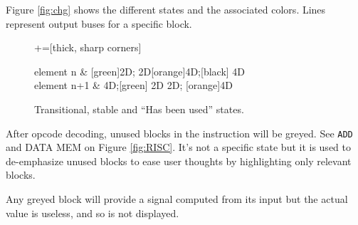 \documentclass[10pt,a4paper]{article}
\theoremstyle{definition}%
\begin{document}
Figure \vref{fig:chg} shows the different states and the associated colors. Lines represent output buses for a specific block.
\begin{figure}[h!]
	\begin{center}
		+=[thick, sharp corners]
		\begin{tikztimingtable}
			element n   &	[green]2D{}; 2D[orange]4D;[black] 4D{}\\
			element n+1	&	4D;[green] 2D{} 2D; [orange]4D{} \\
\extracode
\tablerules
{}
\end{tikztimingtable}
	\end{center}
\caption{Transitional, stable and ``Has been used'' states.}
\label{fig:chg}
\end{figure}

After opcode decoding, unused blocks in the instruction will be greyed. See \verb!ADD! and DATA MEM on Figure \vref{fig:RISC}. It's not a specific state but it is used to de-emphasize unused blocks to ease user thoughts by highlighting only relevant blocks.

Any greyed block will provide a signal computed from its input but the actual value is useless, and so is not displayed. 
\end{document}
